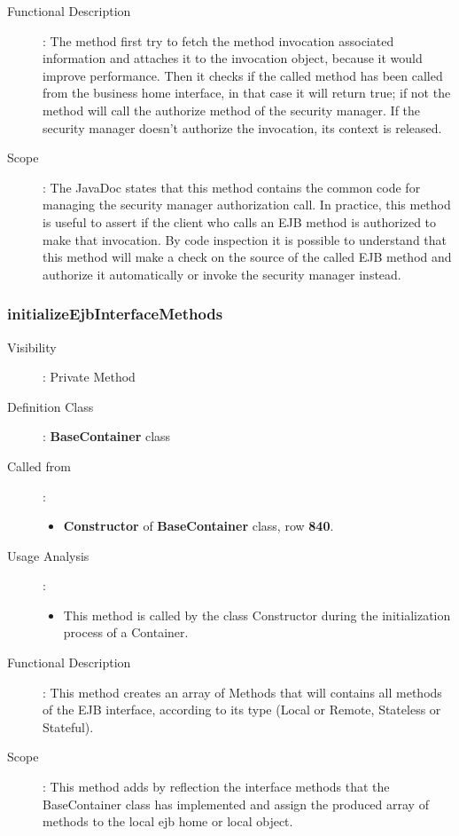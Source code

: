 \documentclass[11pt, a4paper,titlepage]{article}
\begin{document}
\begin{description}
\begin{itemize}
		 	\end{itemize} 
		 	\item[Functional Description]: The method first try to fetch the method invocation associated information and attaches it to the invocation object, because it would improve performance. \newline
		 	Then it checks if the called method has been called from the business home interface, in that case it will return true; if not the method will call the authorize method of the security manager. If the security manager doesn't authorize the invocation, its context is released.
		 	\item[Scope]: The JavaDoc states that this method contains the common code for managing the security manager authorization call. \newline
		 	In practice, this method is useful to assert if the client who calls an EJB method is authorized to make that invocation. \newline
		 	By code inspection it is possible to understand that this method will make a check on the source of the called EJB method and authorize it automatically or invoke the security manager instead. 
		 \end{description}
		 
	 \subsubsection{initializeEjbInterfaceMethods}
	 \begin{description}
	 	\item[Visibility]: Private Method
	 	\item[Definition Class]: \textbf{BaseContainer} class
	 	\item[Called from]: 
	 	\begin{itemize}
	 		\item \textbf{Constructor} of \textbf{BaseContainer} class, row \textbf{840}.
	 	\end{itemize}
	 	\item[Usage Analysis]: 
	 	\begin{itemize}
	 		\item This method is called by the class Constructor during the initialization process of a Container.
	 	\end{itemize} 
	 	\item[Functional Description]: This method creates an array of Methods that will contains all methods of the EJB interface, according to its type (Local or Remote, Stateless or Stateful).
	 	\item[Scope]: This method adds by reflection the interface methods that the BaseContainer class has implemented and assign the produced array of methods to the local ejb home or local object.
	 \end{description}
	 
\end{document}
